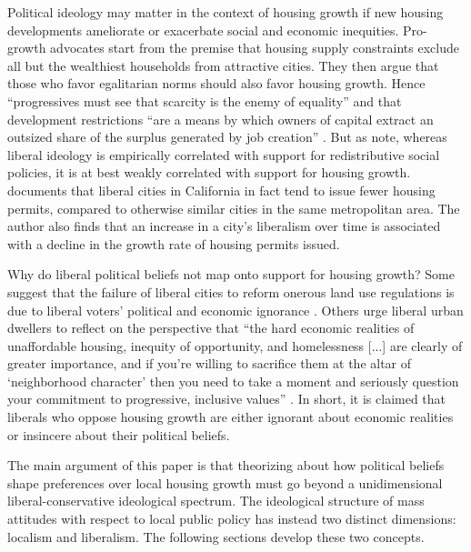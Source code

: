 \documentclass[article,12pt]{memoir}
\begin{document}
Political ideology may matter in the context of housing growth if new housing developments ameliorate or exacerbate social and economic inequities. Pro-growth advocates start from the premise that housing supply constraints exclude all but the wealthiest households from attractive cities. They then argue that those who favor egalitarian norms should also favor housing growth. Hence ``progressives must see that scarcity is the enemy of equality'' \citep{yglesias_rent_2012} and that development restrictions ``are a means by which owners of capital extract an outsized share of the surplus generated by job creation'' \citep{avent_spectre_2014}. But as \citet{marble_where_2018} note, whereas liberal ideology is empirically correlated with support for redistributive social policies, it is at best weakly correlated with support for housing growth. \citet{kahn_liberal_2011} documents that liberal cities in California in fact tend to issue fewer housing permits, compared to otherwise similar cities in the same metropolitan area.  The author also finds that an increase in a city's liberalism over time is associated with a decline in the growth rate of housing permits issued.

Why do liberal political beliefs not map onto support for housing growth? Some suggest that the failure of liberal cities to reform onerous land use regulations is due to liberal voters' political and economic ignorance  \citep{somin_left_2017}. Others urge liberal urban dwellers to reflect on the perspective that ``the hard economic realities of unaffordable housing, inequity of opportunity, and homelessness [...] are clearly of greater importance, and if you're willing to sacrifice them at the altar of `neighborhood character' then you need to take a moment and seriously question your commitment to progressive, inclusive values'' \citep{phillips_disconnect_2016}. In short, it is claimed that liberals who oppose housing growth are either ignorant about economic realities or insincere about their political beliefs.

The main argument of this paper is that theorizing about how political beliefs shape preferences over local housing growth must go beyond a unidimensional liberal-conservative ideological spectrum. The ideological structure of mass attitudes with respect to local public policy has instead two distinct dimensions: localism and liberalism.  The following sections develop these two concepts.

\end{document}
